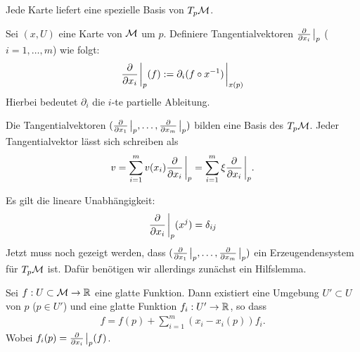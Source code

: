 Jede Karte liefert eine spezielle Basis von $T_p \mathcal{M}$.

\begin{defs}
Sei $(x, U)$ eine Karte von $\mathcal{M}$ um $p$. 
Definiere Tangentialvektoren $\pdv{x_i} \eval_{p} $ ($i = 1, \dots, m$) wie folgt:
\begin{align}
\pdv{x_i}\eval_{p} (f) := \partial_i (f \circ x^{-1}) \eval_{x(p)}
\end{align}
Hierbei bedeutet $\partial_i$ die $i$-te partielle Ableitung.
\end{defs}

\begin{satz}
\label{satz:BasisTPM}
Die Tangentialvektoren $(\pdv{x_1}\eval_{p}, \dots, \pdv{x_m}\eval_{p})$ bilden eine Basis des $T_{p} \mathcal{M}$.
Jeder Tangentialvektor lässt sich schreiben als
\begin{align}
v = \sum_{i=1}^{m} v(x_i) \pdv{x_i}\eval_{p} = \sum_{i=1}^{m} \xi \pdv{x_i}\eval_{p}.
\end{align}
\end{satz}
\begin{bew}
Es gilt die lineare Unabhängigkeit:
\begin{align}
\pdv{x_i}\eval_{p} (x^j) = \delta_{i j}
\end{align}
Jetzt muss noch gezeigt werden, dass $(\pdv{x_1}\eval_{p}, \dots, \pdv{x_m}\eval_{p})$ ein Erzeugendensystem für $T_{p} \mathcal{M}$ ist.
 Dafür benötigen wir allerdings zunächst ein Hilfslemma.
\end{bew}

\begin{hlem}
\label{lem:DarstellungBasisTPM}
Sei $f: U \subset \mathcal{M} \to \mathbb{R}$ eine glatte Funktion.
Dann existiert eine Umgebung $U' \subset U$ von $p$ ($p \in U'$) und eine glatte Funktion
$f_i: U' \to \mathbb{R}$, so dass
\begin{align}
f = f(p) + \sum_{i=1}^{m} ( x_i  - x_i(p)) f_i.
\end{align}
Wobei $f_i (p) = \pdv{x_i}\eval_{p} (f)$.
\end{hlem}

